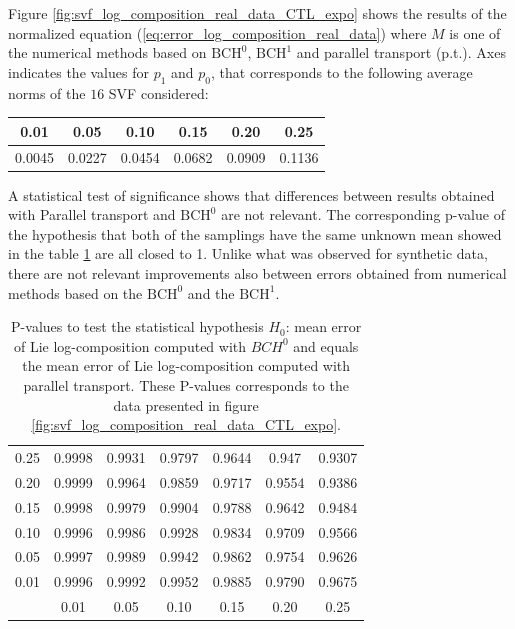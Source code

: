 Figure \ref{fig:svf_log_composition_real_data_CTL_expo} shows the results of the normalized equation (\ref{eq:error_log_composition_real_data}) where $M$ is one of the numerical methods based on $\text{BCH}^0$, $\text{BCH}^1$ and parallel transport (p.t.).
Axes indicates the values for $p_1$ and $p_0$, that corresponds to the following average norms of the $16$ SVF considered:

\begin{center}
	 \centering
	 \begin{tabular}{ c | c | c | c | c | c  }
 	 0.01 & 0.05 & 0.10 & 0.15 & 0.20 & 0.25 \\
 	 \hline
 	 0.0045 &  0.0227 & 0.0454 & 0.0682 & 0.0909 & 0.1136
	 \end{tabular}
\end{center}

A statistical test of significance shows that differences between results obtained with Parallel transport and $\text{BCH}^0$ are not relevant. The corresponding p-value of the hypothesis that both of the samplings have the same unknown mean showed in the table \ref{tabel_p_vals} are all closed to 1. Unlike what was observed for synthetic data, there are not relevant improvements also between errors obtained from numerical methods based on the $\text{BCH}^0$ and the $\text{BCH}^1$.

\begin{table}
\centering
	\begin{tabular}{ c | c  c  c  c  c  c  }
	0.25	& 0.9998 & 0.9931 & 0.9797 & 0.9644 & 0.947  & 0.9307 \\
	0.20	& 0.9999  & 0.9964 &  0.9859 & 0.9717 & 0.9554 & 0.9386\\
	0.15	& 0.9998 & 0.9979 & 0.9904 & 0.9788 &  0.9642 & 0.9484\\
	0.10	& 0.9996 & 0.9986 & 0.9928 & 0.9834 & 0.9709 & 0.9566 \\
	0.05	& 0.9997  & 0.9989 & 0.9942 & 0.9862 & 0.9754 &  0.9626\\
	0.01	& 0.9996 & 0.9992 & 0.9952 & 0.9885 & 0.9790  & 0.9675 \\
		\hline
		& 0.01 & 0.05 & 0.10 & 0.15 & 0.20 & 0.25 \\
	\end{tabular}
	 \caption{P-values to test the statistical hypothesis $H_0$: mean error of Lie log-composition computed with $BCH^0$ and equals the mean error of Lie log-composition computed with parallel transport. These P-values corresponds to the data presented in figure \ref{fig:svf_log_composition_real_data_CTL_expo}. }
	 \label{tabel_p_vals}
	\end{table}

